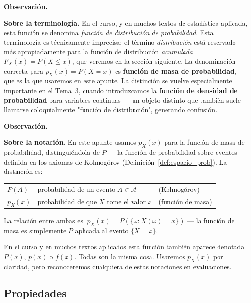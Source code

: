 \documentclass[12pt, a4paper]{book}
\newenvironment{observacion}{%
    \par\medskip\noindent\textbf{\color{azul}Observaci\'{o}n.}\enspace\itshape
}{\par\medskip}
\numberwithin{equation}{chapter}
\begin{document}
\begin{observacion}
	\textbf{Sobre la terminología.} En el curso, y en muchos textos 
	de estadística aplicada, esta función se denomina 
	\textit{función de distribución de probabilidad}. Esta terminología 
	es técnicamente imprecisa: el término \textit{distribución} está 
	reservado más apropiadamente para la función de distribución 
	\textit{acumulada} $F_X(x) = P(X \leq x)$, que veremos en la 
	sección siguiente. La denominación correcta para $p_X(x) = P(X=x)$ 
	es \textbf{función de masa de probabilidad}, que es la que usaremos 
	en este apunte. La distinción se vuelve especialmente importante en 
	el Tema~3, cuando introduzcamos la \textbf{función de densidad de 
		probabilidad} para variables continuas — un objeto distinto que 
	también suele llamarse coloquialmente "función de distribución", 
	generando confusión.
\end{observacion}

\begin{observacion}
	\textbf{Sobre la notación.} En este apunte usamos $p_X(x)$ para 
	la función de masa de probabilidad, distinguiéndola de $P$ — la 
	función de probabilidad sobre eventos definida en los axiomas de 
	Kolmogórov (Definición~\ref{def:espacio_prob}). La distinción es:
	
	\medskip
	\begin{center}
		\begin{tabular}{@{}lll@{}}
			$P(A)$ & probabilidad de un evento $A \in \mathcal{A}$ & 
			(Kolmogórov) \\[4pt]
			$p_X(x)$ & probabilidad de que $X$ tome el valor $x$ & 
			(función de masa) \\
		\end{tabular}
	\end{center}
	
	\medskip
	La relación entre ambas es: $p_X(x) = P(\{\omega : X(\omega) = x\})$
	— la función de masa es simplemente $P$ aplicada al evento 
	$\{X = x\}$.
	
	\medskip
	En el curso y en muchos textos aplicados esta función también 
	aparece denotada $P(x)$, $p(x)$ o $f(x)$. Todas son la misma 
	cosa. Usaremos $p_X(x)$ por claridad, pero reconoceremos cualquiera 
	de estas notaciones en evaluaciones.
\end{observacion}

\subsection{Propiedades}
\end{document}
